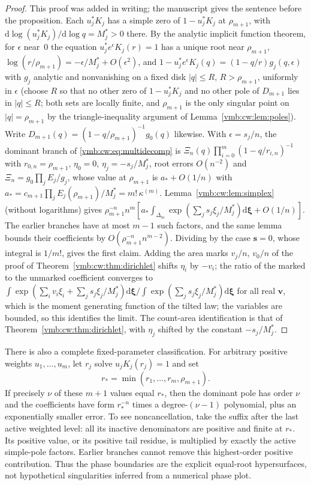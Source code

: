 \documentclass[11pt,a4paper]{article}
\numberwithin{equation}{section}
\theoremstyle{definition}\newtheorem{definition}[theorem]{Definition}
\theoremstyle{remark}\newtheorem{remark}[theorem]{Remark}
\newcommand{\dd}{\mathrm d}
\begin{document}
\begin{proof}
This proof was added in writing; the manuscript gives the sentence before
the proposition. Each $u_j^*K_j$ has a simple zero of $1-u_j^*K_j$ at
$\rho_{m+1}$, with $\dd\log(u_j^*K_j)/\dd\log q=M_j^*>0$ there. By the
analytic implicit function theorem, for $\epsilon$ near~$0$ the equation
$u_j^*e^{\epsilon}K_j(r)=1$ has a unique root near $\rho_{m+1}$,
$\log(r/\rho_{m+1})=-\epsilon/M_j^*+O(\epsilon^2)$, and
$1-u_j^*e^{\epsilon}K_j(q)=(1-q/r)g_j(q,\epsilon)$ with $g_j$ analytic and
nonvanishing on a fixed disk $|q|\le R$, $R>\rho_{m+1}$, uniformly in
$\epsilon$ (choose $R$ so that no other zero of $1-u_j^*K_j$ and no other
pole of $D_{m+1}$ lies in $|q|\le R$; both sets are locally finite, and
$\rho_{m+1}$ is the only singular point on $|q|=\rho_{m+1}$ by the
triangle-inequality argument of Lemma~\ref{vmb:cw:lem:poles}). Write
$D_{m+1}(q)=(1-q/\rho_{m+1})^{-1}g_0(q)$ likewise. With
$\epsilon=s_j/n$, the dominant branch of \eqref{vmb:cw:eq:multidecomp} is
$\Xi_n(q)\prod_{i=0}^m(1-q/r_{i,n})^{-1}$ with $r_{0,n}=\rho_{m+1}$,
$\eta_0=0$, $\eta_j=-s_j/M_j^*$, root errors $O(n^{-2})$ and
$\Xi_n=g_0\prod_jE_j/g_j$, whose value at $\rho_{m+1}$ is
$a_*+O(1/n)$ with $a_*=c_{m+1}\prod_jE_j(\rho_{m+1})/M_j^*=m!\,\kappa^{(m)}$.
Lemma~\ref{vmb:cw:lem:simplex} (without logarithms) gives
$\rho_{m+1}^{-n}n^m[a_*\int_{\Delta_m}\exp(\sum_js_j\xi_j/M_j^*)\dd\bm\xi
+O(1/n)]$. The earlier branches have at most $m-1$ such factors, and the
same lemma bounds their coefficients by $O(\rho_{m+1}^{-n}n^{m-2})$. Dividing
by the case $\bm s=0$, whose integral is $1/m!$, gives the first claim.
Adding the area marks $v_j/n$, $v_0/n$ of the proof of
Theorem~\ref{vmb:cw:thm:dirichlet} shifts $\eta_i$ by $-v_i$; the ratio of the
marked to the unmarked coefficient converges to
$\int\exp(\sum_iv_i\xi_i+\sum_js_j\xi_j/M_j^*)\dd\bm\xi/
\int\exp(\sum_js_j\xi_j/M_j^*)\dd\bm\xi$ for all real $\bm v$, which is the
moment generating function of the tilted law; the variables are bounded,
so this identifies the limit. The count-area identification is that of
Theorem~\ref{vmb:cw:thm:dirichlet}, with $\eta_j$ shifted by the constant
$-s_j/M_j^*$.
\end{proof}

There is also a complete fixed-parameter classification. For arbitrary
positive weights $u_1,\ldots,u_m$, let $r_j$ solve $u_jK_j(r_j)=1$ and set
\begin{equation}\label{vmb:cw:eq:chambers}
 r_* =\min(r_1,\ldots,r_m,\rho_{m+1}).
\end{equation}
If precisely $\nu$ of these $m+1$ values equal $r_*$, then the dominant pole
has order $\nu$ and the coefficients have form
$r_*^{-n}$ times a degree-$(\nu-1)$ polynomial, plus an exponentially smaller
error. To see noncancellation, take the suffix after the last active
weighted level: all its inactive denominators are positive and finite at
$r_*$. Its positive value, or its positive tail residue, is multiplied by
exactly the active simple-pole factors. Earlier branches cannot remove this
highest-order positive contribution. Thus the phase boundaries are the
explicit equal-root hypersurfaces, not hypothetical singularities inferred
from a numerical phase plot.
\end{document}
